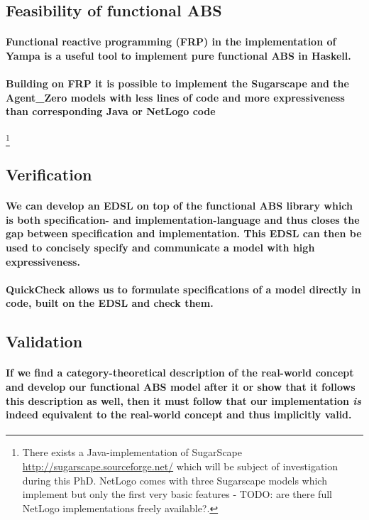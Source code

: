 \subsection{Feasibility of functional ABS}
\paragraph{Functional reactive programming (FRP) in the implementation of Yampa is a useful tool to implement pure functional ABS in Haskell.}
\paragraph{Building on FRP it is possible to implement the Sugarscape and the Agent\_Zero models with less lines of code and more expressiveness than corresponding Java or NetLogo code} 
\footnote{There exists a Java-implementation of SugarScape \url{http://sugarscape.sourceforge.net/} which will be subject of investigation during this PhD. NetLogo comes with three Sugarscape models which implement but only the first very basic features - TODO: are there full NetLogo implementations freely available?.}

\subsection{Verification}
\paragraph{We can develop an EDSL on top of the functional ABS library which is both specification- and implementation-language and thus closes the gap between specification and implementation. This EDSL can then be used to concisely specify and communicate a model with high expressiveness.}
\paragraph{QuickCheck allows us to formulate specifications of a model directly in code, built on the EDSL and check them.}

\subsection{Validation}
\paragraph{If we find a category-theoretical description of the real-world concept and develop our functional ABS model after it or show that it follows this description as well, then it must follow that our implementation \textit{is} indeed equivalent to the real-world concept and thus implicitly valid.}

